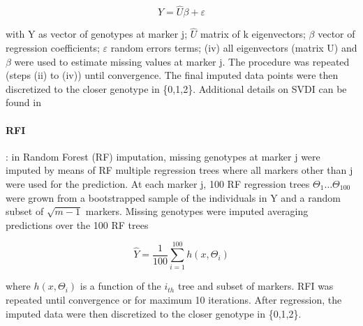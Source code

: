 \begin{equation}
\label{eq:SVDI_regression}
Y = \hat{U}\beta +\varepsilon 
\end{equation}

with Y as vector of genotypes at marker j; $\hat{U}$ matrix of k eigenvectors; $\beta$ vector of regression coefficients; $\varepsilon$ random errors terms; (iv) all eigenvectors (matrix U) and $\beta$ were used to estimate missing values at marker j. The procedure was repeated (steps (ii) to (iv)) until convergence. The final imputed data points were then discretized to the closer genotype in \{0,1,2\}. Additional details on SVDI can be found in \cite{troyanskaya_missing_2001}

\paragraph{RFI}
\label{par:RFI}
: in Random Forest (RF) imputation, missing genotypes at marker j were imputed by means of RF multiple regression trees \cite{breiman_random_2001} where all markers other than j were used for the prediction. At each marker j, 100 RF regression trees $\Theta_{1} \ldots \Theta_{100}$ were grown from a bootstrapped sample of the individuals in Y and a random subset of $\sqrt{m-1}$ markers. Missing genotypes were imputed averaging predictions over the 100 RF trees

\begin{equation}
\label{eq:RFI_regression}
\hat{Y} = \frac{1}{100}\sum_{i=1}^{100} h(x,\Theta_i)
\end{equation}

where $h(x,\Theta_i)$ is a function of the $i_{th}$ tree and subset of markers. RFI was repeated until convergence or for maximum 10 iterations. After regression, the imputed data were then discretized to the closer genotype in \{0,1,2\}. 

